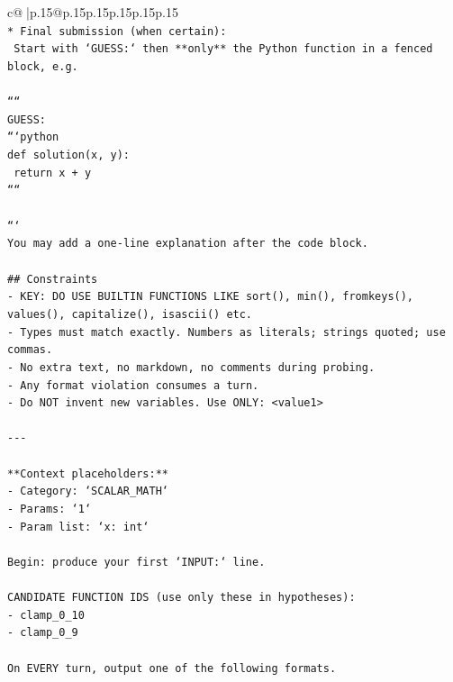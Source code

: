\documentclass{article}
\begin{document}
{\begin{supertabular}{c@{$\;$}|p{.15\linewidth}@{}p{.15\linewidth}p{.15\linewidth}p{.15\linewidth}p{.15\linewidth}p{.15\linewidth}}
{{{\\ 
\texttt{* Final submission (when certain):} \\
\texttt{  Start with `GUESS:` then **only** the Python function in a fenced block, e.g.} \\
\\ 
\texttt{````} \\
\texttt{GUESS:} \\
\texttt{```python} \\
\texttt{def solution(x, y):} \\
\texttt{    return x + y} \\
\texttt{````} \\
\\ 
\texttt{```} \\
\texttt{You may add a one{-}line explanation after the code block.} \\
\\ 
\texttt{\#\# Constraints} \\
\texttt{{-} KEY: DO USE BUILTIN FUNCTIONS LIKE sort(), min(), fromkeys(), values(), capitalize(), isascii() etc.} \\
\texttt{{-} Types must match exactly. Numbers as literals; strings quoted; use commas.} \\
\texttt{{-} No extra text, no markdown, no comments during probing.} \\
\texttt{{-} Any format violation consumes a turn.} \\
\texttt{{-} Do NOT invent new variables. Use ONLY: <value1>} \\
\\ 
\texttt{{-}{-}{-}} \\
\\ 
\texttt{**Context placeholders:**} \\
\texttt{{-} Category: `SCALAR\_MATH`} \\
\texttt{{-} Params: `1`} \\
\texttt{{-} Param list: `x: int`} \\
\\ 
\texttt{Begin: produce your first `INPUT:` line.} \\
\\ 
\texttt{CANDIDATE FUNCTION IDS (use only these in hypotheses):} \\
\texttt{{-} clamp\_0\_10} \\
\texttt{{-} clamp\_0\_9} \\
\\ 
\texttt{On EVERY turn, output one of the following formats.} \\
}}}
\end{supertabular}}
\end{document}
